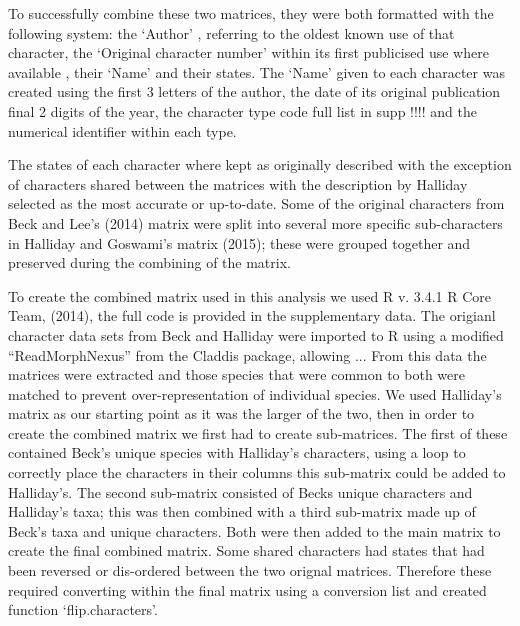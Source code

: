 \documentclass[11pt,letterpaper]{article}
\begin{document}
To successfully combine these two matrices, they were both formatted %
 with the following system: the `Author' %
 , referring to the oldest known use of that character, the `Original character number' within its first publicised use where available %
 , their `Name' and their states.
 The `Name' given to each character was created using the first 3 letters of the author, the date of its original publication final 2 digits of the year, the character type code full list in supp !!!! and the numerical identifier within each type. %

The states of each character where kept as originally described with the exception of characters shared between the matrices with the description by Halliday selected as the most accurate or up-to-date. Some of the original characters from Beck and Lee's (2014) matrix were split into several more specific sub-characters in Halliday and Goswami's matrix (2015); these were grouped together and preserved during the combining of the matrix. %

To create the combined matrix used in this analysis we used R v. 3.4.1 R Core Team, (2014), the full code is provided in the supplementary data.
The origianl character data sets from Beck %
and Halliday were imported to R using a modified ``ReadMorphNexus'' from the Claddis package, allowing ... %
From this data the matrices were extracted and those species that were common to both were matched to prevent over-representation of individual species.
We used Halliday's matrix as our starting point as it was the larger of the two, then in order to create the combined matrix we first had to create sub-matrices.
The first of these contained Beck's unique species with Halliday's characters, using a loop to correctly place the characters in their columns this sub-matrix could be added to Halliday's.
The second sub-matrix consisted of Becks unique characters and Halliday's taxa; this was then combined with a third sub-matrix made up of Beck's taxa and unique characters.
Both were then added to the main matrix to create the final combined matrix.
Some shared characters had states that had been reversed or dis-ordered between the two orignal matrices.
Therefore these required converting within the final matrix using a conversion list and created function `flip.characters'.
\end{document}
